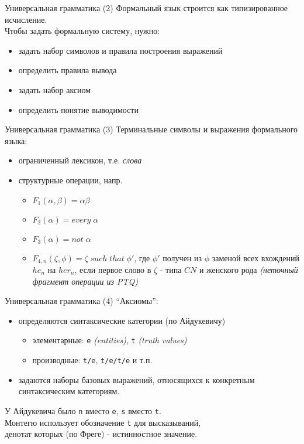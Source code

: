 \documentclass{beamer}
\begin{document}
\begin{frame}{Универсальная грамматика (2)}
Формальный язык строится как типизированное исчисление.\\
\bigskip
\bigskip
Чтобы задать формальную систему, нужно:\\
\begin{itemize}
  \item задать набор символов и правила построения выражений
  \item определить правила вывода
  \item задать набор аксиом
  \item определить понятие выводимости
\end{itemize}
\end{frame}

\begin{frame}{Универсальная грамматика (3)}
Терминальные символы и выражения формального языка:\\
\begin{itemize}
  \item ограниченный лексикон, т.е. \textit{слова}
  \item структурные операции, напр. 
    \begin{itemize}
      \item $F_1(\alpha, \beta) = \alpha \beta$
      \item $F_2(\alpha) = every \; \alpha$
      \item $F_3(\alpha) = not \; \alpha$
      \item $F_{4,n}(\zeta, \phi) = \zeta \; such \; that \; \phi'$, где $\phi'$ получен из $\phi$ заменой всех вхождений $he_n$ на $her_n$, если первое слово в $\zeta$ - типа $CN$ и женского рода \textit{(неточный фрагмент операции из PTQ)}
    \end{itemize}
\end{itemize}
\end{frame}

\begin{frame}{Универсальная грамматика (4)}
``Аксиомы'':\\
\begin{itemize}
  \item определяются синтаксические категории (по Айдукевичу)
    \begin{itemize}
      \item элементарные: \texttt{e} \textit{(entities)}, \texttt{t} \textit{(truth values)}
      \item производные: \texttt{t/e}, \texttt{t/e/t/e} и т.п.
    \end{itemize}
  \item задаются наборы базовых выражений, относящихся к конкретным синтаксическим категориям.
\end{itemize}
\bigskip
У Айдукевича было \texttt{n} вместо \texttt{e}, \texttt{s} вместо \texttt{t}. \\
\bigskip
Монтегю использует обозначение \texttt{t} для высказываний, \\денотат которых (по Фреге) - истинностное значение.
\end{frame}
\end{document}
